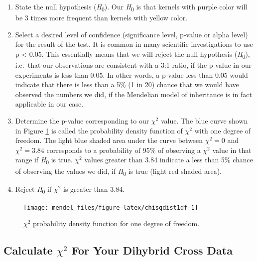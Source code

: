 \documentclass[]{book}
\providecommand{\tightlist}{%
  \setlength{\itemsep}{0pt}\setlength{\parskip}{0pt}}
\begin{document}
\begin{enumerate}
\def\labelenumi{\arabic{enumi}.}
\tightlist
\item
  State the null hypothesis (\emph{H}\textsubscript{0}). Our
  \emph{H}\textsubscript{0} is that kernels with purple color will be 3
  times more frequent than kernels with yellow color.
\item
  Select a desired level of confidence (significance level, p-value or
  alpha level) for the result of the test. It is common in many
  scientific investigations to use p \textless{} 0.05. This essentially
  means that we will reject the null hypothesis
  (\emph{H}\textsubscript{0}), i.e.~that our observations are consistent
  with a 3:1 ratio, if the p-value in our experiments is less than 0.05.
  In other words, a p-value less than 0.05 would indicate that there is
  less than a 5\% (1 in 20) chance that we would have observed the
  numbers we did, if the Mendelian model of inheritance is in fact
  applicable in our case.
\item
  Determine the p-value corresponding to our \(\chi^2\) value. The blue
  curve shown in Figure \ref{fig:chisqdist1df} is called the probability
  density function of \(\chi^2\) with one degree of freedom. The light
  blue shaded area under the curve between \(\chi^2=0\) and
  \(\chi^2=3.84\) corresponds to a probability of 95\% of observing a
  \(\chi^2\) value in that range if \emph{H}\textsubscript{0} is true.
  \(\chi^2\) values greater than 3.84 indicate a less than 5\% chance of
  observing the values we did, if \emph{H}\textsubscript{0} is true
  (light red shaded area).
\item
  Reject \emph{H}\textsubscript{0} if \(\chi^2\) is greater than 3.84.
\end{enumerate}




\begin{figure}

{\centering \texttt{[image: mendel\_files/figure-latex/chisqdist1df-1]} 

}

\caption{\(\chi^2\) probability density function for one
degree of freedom.}\label{fig:chisqdist1df}
\end{figure}

\subsection{\texorpdfstring{Calculate \(\chi^2\) For Your Dihybrid Cross
Data}{Calculate \textbackslash{}chi\^{}2 For Your Dihybrid Cross Data}}\label{calculate-chi2-for-your-dihybrid-cross-data}
\end{document}
